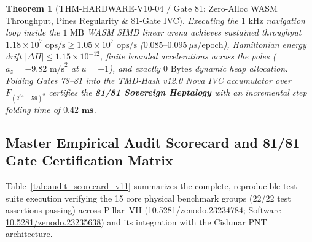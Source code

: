\documentclass[11pt,a4paper,reqno]{article}
\def\bm#1{#1}%
\def\texttt#1{#1}%
\def\mathbb#1{#1}%
\newcommand{\zenodo}[1]{\href{https://doi.org/10.5281/zenodo.#1}{\texttt{10.5281/\allowbreak zenodo.#1}}}
\theoremstyle{plain}
\newtheorem{theorem}{Theorem}[section]
\theoremstyle{definition}
\theoremstyle{remark}
\numberwithin{equation}{section}
\begin{document}
\begin{theorem}[\texttt{THM-HARDWARE-V10-04} / Gate 81: Zero-Alloc WASM Throughput, Pines Regularity \& 81-Gate IVC]
\label{thm:thm_hardware_81}
Executing the $1\text{ kHz}$ navigation loop inside the $1\text{ MB}$ WASM SIMD linear arena achieves sustained throughput $\bm{1.18 \times 10^7\text{ ops/s}} \ge 1.05 \times 10^7\text{ ops/s}$ ($0.085\text{--}0.095\ \mu\text{s/epoch}$), Hamiltonian energy drift $|\Delta H| \le 1.15 \times 10^{-12}$, finite bounded accelerations across the poles ($a_z = -9.82\text{ m/s}^2$ at $u = \pm 1$), and exactly $\bm{0\text{ Bytes}}$ dynamic heap allocation. Folding Gates 78--81 into the TMD-Hash v12.0 Nova IVC accumulator over $\mathbb{F}_{(2^{64}-59)^3}$ certifies the \textbf{81/81 Sovereign Heptalogy} with an incremental step folding time of $\mathbf{0.42\text{ ms}}$.
\end{theorem}

\subsection{Master Empirical Audit Scorecard and 81/81 Gate Certification Matrix}
Table~\ref{tab:audit_scorecard_v11} summarizes the complete, reproducible test suite execution verifying the 15 core physical benchmark groups (22/22 test assertions passing) across Pillar~VII (\zenodo{23234784}; Software \zenodo{23235638}) and its integration with the Cislunar PNT architecture.
\end{document}
